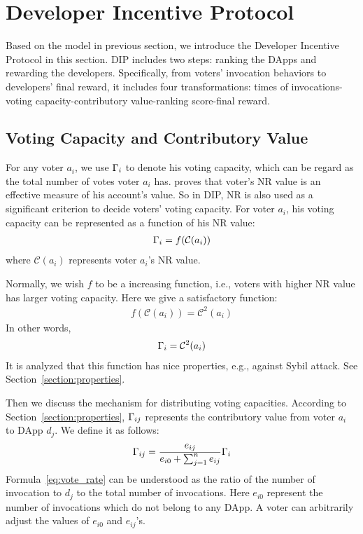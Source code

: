 \section{Developer Incentive Protocol}
Based on the model in previous section, we introduce the Developer Incentive Protocol in this section. DIP includes two steps: ranking the DApps and rewarding the developers. Specifically, from voters' invocation behaviors to developers' final reward, it includes four transformations: times of invocations-voting capacity-contributory value-ranking score-final reward.

\subsection{Voting Capacity and Contributory Value}
For any voter $a_i$, we use $\Gamma_i$ to denote his voting capacity, which can be regard as the total number of votes voter $a_i$ has. \cite{Nebulasyellowpaper} proves that voter's NR value is an effective measure of his account's value. So in DIP, NR is also used as a significant criterion to decide voters' voting capacity. For voter $a_i$, his voting capacity can be represented as a function of his NR value:
\begin{align}
	\Gamma_i = f(\mathcal{C}(a_i))
\end{align}
where $\mathcal{C}(a_i)$ represents voter $a_i$'s NR value.

Normally, we wish $f$ to be a increasing function, i.e., voters with higher NR value has larger voting capacity. Here we give a satisfactory function:
\begin{align}
	f(\mathcal{C}(a_i))=\mathcal{C}^2(a_i)
\end{align}
In other words,
\begin{align}
	\Gamma_i = \mathcal{C}^2(a_i)
\end{align}
It is analyzed that this function has nice properties, e.g., against Sybil attack. See Section~\ref{section:properties}.

Then we discuss the mechanism for  distributing voting capacities. According to Section~\ref{section:properties}, $\Gamma_{ij}$ represents the contributory value from voter $a_i$ to DApp $d_j$. We define it as follows:
\begin{align}
	\label{eq:vote_rate}
	\Gamma_{ij} = \frac{e_{ij}}{e_{i0}+\sum_{j=1}^n {e_{ij}}} \Gamma_i
\end{align}
Formula~\ref{eq:vote_rate} can be understood as the ratio of the number of invocation to $d_j$ to the total number of invocations. Here $e_{i0}$ represent the number of invocations which do not belong to any DApp. A voter can arbitrarily adjust the values of $e_{i0}$ and $e_{ij}$'s.

